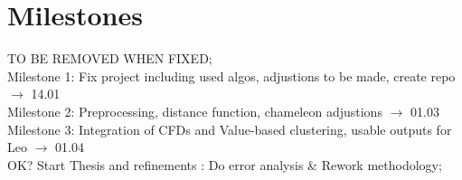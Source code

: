 \chapter{Milestones}
TO BE REMOVED WHEN FIXED; \\

Milestone 1: Fix project including used algos, adjustions to be made, create repo $\rightarrow$ 14.01 \\
Milestone 2: Preprocessing, distance function, chameleon adjustions $\rightarrow$ 01.03 \\
Milestone 3: Integration of CFDs and Value-based clustering, usable outputs for Leo $\rightarrow$ 01.04 \\

OK? Start Thesis and refinements : Do error analysis \& Rework methodology; \\

